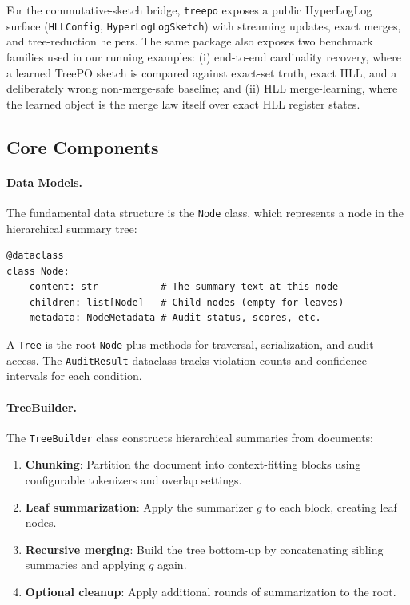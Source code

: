 For the commutative-sketch bridge, \texttt{treepo} exposes a public HyperLogLog surface (\texttt{HLLConfig}, \texttt{HyperLogLogSketch}) with streaming updates, exact merges, and tree-reduction helpers. The same package also exposes two benchmark families used in our running examples: (i) end-to-end cardinality recovery, where a learned TreePO sketch is compared against exact-set truth, exact HLL, and a deliberately wrong non-merge-safe baseline; and (ii) HLL merge-learning, where the learned object is the merge law itself over exact HLL register states.

\subsection{Core Components}

\paragraph{Data Models.}
The fundamental data structure is the \texttt{Node} class, which represents a node in the hierarchical summary tree:

\begin{lstlisting}
@dataclass
class Node:
    content: str           # The summary text at this node
    children: list[Node]   # Child nodes (empty for leaves)
    metadata: NodeMetadata # Audit status, scores, etc.
\end{lstlisting}

A \texttt{Tree} is the root \texttt{Node} plus methods for traversal, serialization, and audit access. The \texttt{AuditResult} dataclass tracks violation counts and confidence intervals for each condition.

\paragraph{TreeBuilder.}
The \texttt{TreeBuilder} class constructs hierarchical summaries from documents:

\begin{enumerate}[nosep]
    \item \textbf{Chunking}: Partition the document into context-fitting blocks using configurable tokenizers and overlap settings.
    \item \textbf{Leaf summarization}: Apply the summarizer $g$ to each block, creating leaf nodes.
    \item \textbf{Recursive merging}: Build the tree bottom-up by concatenating sibling summaries and applying $g$ again.
    \item \textbf{Optional cleanup}: Apply additional rounds of summarization to the root.
\end{enumerate}


